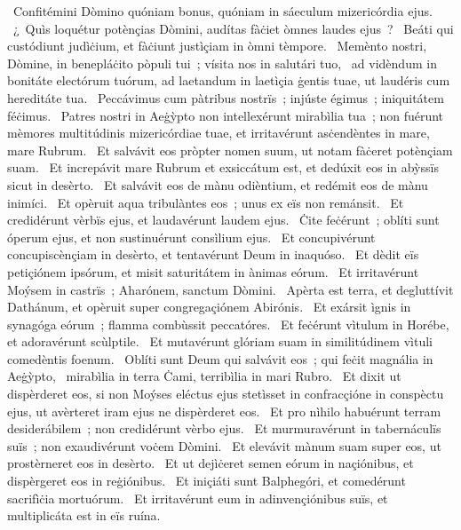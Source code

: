 ~Confitémini Dòmino quóniam bonus, quóniam in sáeculum mizericórdia ejus. 
~¿~Quìs loquétur potènçias Dòmini, audítas fàċiet òmnes laudes ejus~? 
~Beáti qui custódiunt judìċium, et fàċiunt justìçiam in òmni tèmpore. 
~Memènto nostri, Dòmine, in benepláċito pòpuli tui~; vísita nos in salutári tuo, 
~ad vidèndum in bonitáte electórum tuórum, ad laetandum in laetìçia ġentis tuae, ut laudéris cum hereditáte tua. 
~Peccávimus cum pàtribus nostrïs~; injúste égimus~; iniquitátem féċimus. 
~Patres nostri in Aeġỳpto non intellexérunt mirabìlia tua~; non fuérunt mèmores multitúdinis mizericórdiae tuae, et irritavérunt asċendèntes in mare, mare Rubrum. 
~Et salvávit eos pròpter nomen suum, ut notam fàċeret potènçiam suam. 
~Et increpávit mare Rubrum et exsiccátum est, et dedúxit eos in abỳssïs sicut in desèrto. 
~Et salvávit eos de mànu odièntium, et redémit eos de mànu inimíci. 
~Et opèruit aqua tribulàntes eos~; unus ex eïs non remánsit. 
~Et credidérunt vèrbïs ejus, et laudavérunt laudem ejus. 
~Ċite feċérunt~; oblíti sunt óperum ejus, et non sustinuérunt consìlium ejus. 
~Et concupivérunt concupiscènçiam in desèrto, et tentavérunt Deum in inaquóso. 
~Et dèdit eïs petiçiónem ipsórum, et misit saturitátem in ànimas eórum. 
~Et irritavérunt Moýsem in castrïs~; Aharónem, sanctum Dòmini. 
~Apèrta est terra, et degluttívit Dathánum, et opèruit super congregaçiónem Abirónis. 
~Et exársit ìgnis in synagóga eórum~; flamma combùssit peccatóres. 
~Et feċérunt vìtulum in Horébe, et adoravérunt scùlptile. 
~Et mutavérunt glóriam suam in similitúdinem vìtuli comedèntis foenum. 
~Oblíti sunt Deum qui salvávit eos~; qui feċit magnália in Aeġỳpto, 
~mirabìlia in terra Ċami, terribìlia in mari Rubro. 
~Et dixit ut dispèrderet eos, si non Moýses eléctus ejus stetìsset in confracçióne in conspèctu ejus, ut avèrteret iram ejus ne dispèrderet eos. 
~Et pro nìhilo habuérunt terram desiderábilem~; non credidérunt vèrbo ejus. 
~Et murmuravérunt in tabernáculïs suïs~; non exaudivérunt voċem Dòmini. 
~Et elevávit mànum suam super eos, ut prostèrneret eos in desèrto. 
~Et ut dejìċeret semen eórum in naçiónibus, et dispèrgeret eos in reġiónibus. 
~Et iniçiáti sunt Balphegóri, et comedérunt sacrifìċia mortuórum. 
~Et irritavérunt eum in adinvençiónibus suïs, et multiplicáta est in eïs ruína. 
